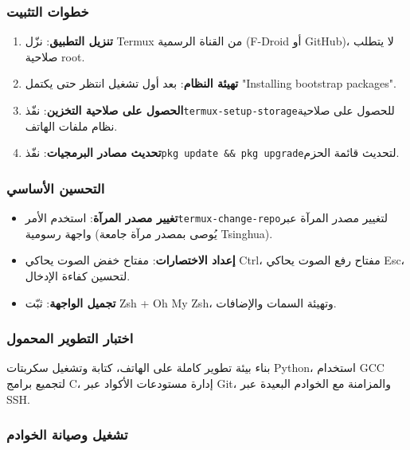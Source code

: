 
\subsubsection*{خطوات التثبيت}

\begin{enumerate}
  \item \textbf{تنزيل التطبيق}: نزّل Termux من القناة الرسمية (F-Droid أو GitHub)، لا يتطلب صلاحية root.
  \item \textbf{تهيئة النظام}: بعد أول تشغيل انتظر حتى يكتمل "Installing bootstrap packages".
  \item \textbf{الحصول على صلاحية التخزين}: نفّذ\texttt{termux-\allowbreak setup-\allowbreak storage}للحصول على صلاحية نظام ملفات الهاتف.
  \item \textbf{تحديث مصادر البرمجيات}: نفّذ\texttt{pkg update \&\& pkg upgrade}لتحديث قائمة الحزم.
\end{enumerate}

\subsubsection*{التحسين الأساسي}

\begin{itemize}
  \item \textbf{تغيير مصدر المرآة}: استخدم الأمر\texttt{termux-\allowbreak change-\allowbreak repo}لتغيير مصدر المرآة عبر واجهة رسومية (يُوصى بمصدر مرآة جامعة Tsinghua).
  \item \textbf{إعداد الاختصارات}: مفتاح خفض الصوت يحاكي Ctrl، مفتاح رفع الصوت يحاكي Esc، لتحسين كفاءة الإدخال.
  \item \textbf{تجميل الواجهة}: ثبّت Zsh + Oh My Zsh، وتهيئة السمات والإضافات.
\end{itemize}


\subsubsection*{اختبار التطوير المحمول}

بناء بيئة تطوير كاملة على الهاتف، كتابة وتشغيل سكربتات Python، استخدام GCC لتجميع برامج C، إدارة مستودعات الأكواد عبر Git، والمزامنة مع الخوادم البعيدة عبر SSH.

\subsubsection*{تشغيل وصيانة الخوادم}

